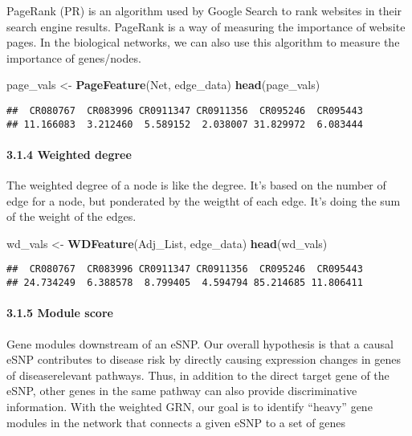 \documentclass[]{article}
\newenvironment{Shaded}{\begin{snugshade}}{\end{snugshade}}
\newcommand{\KeywordTok}[1]{\textcolor[rgb]{0.13,0.29,0.53}{\textbf{#1}}}
\newcommand{\StringTok}[1]{\textcolor[rgb]{0.31,0.60,0.02}{#1}}
\newcommand{\NormalTok}[1]{#1}
\let\oldparagraph\paragraph
\renewcommand{\paragraph}[1]{\oldparagraph{#1}\mbox{}}
\begin{document}
PageRank (PR) is an algorithm used by Google Search to rank websites in
their search engine results. PageRank is a way of measuring the
importance of website pages. In the biological networks, we can also use
this algorithm to measure the importance of genes/nodes.

\begin{Shaded}
\begin{Highlighting}[]
\NormalTok{page_vals <-}\StringTok{ }\KeywordTok{PageFeature}\NormalTok{(Net, edge_data)}
\KeywordTok{head}\NormalTok{(page_vals)}
\end{Highlighting}
\end{Shaded}

\begin{verbatim}
##  CR080767  CR083996 CR0911347 CR0911356  CR095246  CR095443 
## 11.166083  3.212460  5.589152  2.038007 31.829972  6.083444
\end{verbatim}

\paragraph{3.1.4 Weighted degree}\label{weighted-degree}

The weighted degree of a node is like the degree. It's based on the
number of edge for a node, but ponderated by the weigtht of each edge.
It's doing the sum of the weight of the edges.

\begin{Shaded}
\begin{Highlighting}[]
\NormalTok{wd_vals <-}\StringTok{ }\KeywordTok{WDFeature}\NormalTok{(Adj_List, edge_data)}
\KeywordTok{head}\NormalTok{(wd_vals)}
\end{Highlighting}
\end{Shaded}

\begin{verbatim}
##  CR080767  CR083996 CR0911347 CR0911356  CR095246  CR095443 
## 24.734249  6.388578  8.799405  4.594794 85.214685 11.806411
\end{verbatim}

\paragraph{3.1.5 Module score}\label{module-score}

Gene modules downstream of an eSNP. Our overall hypothesis is that a
causal eSNP contributes to disease risk by directly causing expression
changes in genes of diseaserelevant pathways. Thus, in addition to the
direct target gene of the eSNP, other genes in the same pathway can also
provide discriminative information. With the weighted GRN, our goal is
to identify ``heavy'' gene modules in the network that connects a given
eSNP to a set of genes
\end{document}
